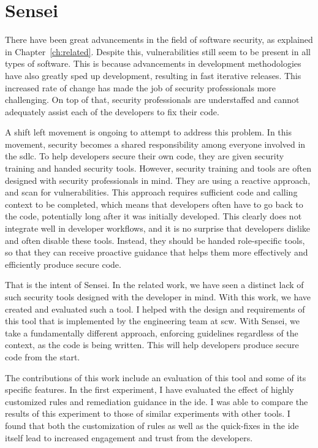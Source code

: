 \section{Sensei}
There have been great advancements in the field of software security, as explained in Chapter~\ref{ch:related}.
Despite this, vulnerabilities still seem to be present in all types of software.
This is because advancements in development methodologies have also greatly sped up development, resulting in fast iterative releases.
This increased rate of change has made the job of security professionals more challenging.
On top of that, security professionals are understaffed and cannot adequately assist each of the developers to fix their code.

A shift left movement is ongoing to attempt to address this problem.
In this movement, security becomes a shared responsibility among everyone involved in the \gls{sdlc}.
To help developers secure their own code, they are given security training and handed security tools.
However, security training and tools are often designed with security professionals in mind.
They are using a reactive approach, and scan for vulnerabilities.
This approach requires sufficient code and calling context to be completed, which means that developers often have to go back to the code, potentially long after it was initially developed.
This clearly does not integrate well in developer workflows, and it is no surprise that developers dislike and often disable these tools.
Instead, they should be handed role-specific tools, so that they can receive proactive guidance that helps them more effectively and efficiently produce secure code.

That is the intent of Sensei.
In the related work, we have seen a distinct lack of such security tools designed with the developer in mind.
With this work, we have created and evaluated such a tool.
I helped with the design and requirements of this tool that is implemented by the engineering team at \gls{scw}.
With Sensei, we take a fundamentally different approach, enforcing guidelines regardless of the context, as the code is being written.
This will help developers produce secure code from the start.

The contributions of this work include an evaluation of this tool and some of its specific features.
In the first experiment, I have evaluated the effect of highly customized rules and remediation guidance in the \gls{ide}.
I was able to compare the results of this experiment to those of similar experiments with other tools.
I found that both the customization of rules as well as the quick-fixes in the \gls{ide} itself lead to increased engagement and trust from the developers.

